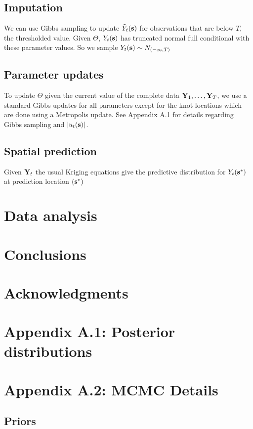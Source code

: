 \documentclass[11pt]{article}
\begin{document}
\subsection{Imputation}\label{s:impute}
We can use Gibbs sampling to update ${\tilde Y}_t(\mbox{\bf s})$ for observations that are below $T$, the thresholded value. Given $\Theta$, $Y_t(\mbox{\bf s})$ has truncated normal full conditional with these parameter values.
So we sample $Y_t(\mbox{\bf s}) \sim N_{(-\infty, T)}$

\subsection{Parameter updates}\label{s:params}
To update $\Theta$ given the current value of the complete data $\mbox{\bf Y}_1, \ldots, \mbox{\bf Y}_T$, we use a standard Gibbs updates for all parameters except for the knot locations which are done using a Metropolis update.
See Appendix A.1 for details regarding Gibbs sampling and $|u_t(\mbox{\bf s})|$.

\subsection{Spatial prediction}\label{s:pred}
Given $\mbox{\bf Y}_t$ the usual Kriging equations give the predictive distribution for $Y_t(\mbox{\bf s}^*)$ at prediction location $(\mbox{\bf s}^*)$


\section{Data analysis}\label{s:analysis}


\section{Conclusions}\label{s:con}

\section*{Acknowledgments}

\section*{Appendix A.1: Posterior distributions}




\section*{Appendix A.2: MCMC Details}

\subsection*{Priors}





\end{document}
